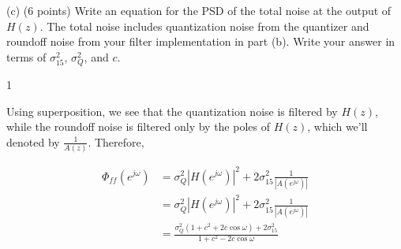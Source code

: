 \documentclass[10pt]{article}
\def\SOLUTIONS{0} %
\def\SolutionsColor{red2}
\begin{document}
\begin{description}
\item{(c)} (6 points) Write an equation for the PSD of the total noise at the output of $H(z)$. The total noise includes quantization noise from the quantizer and roundoff noise from your filter implementation in part (b). Write your answer in terms of $\sigma_{15}^2$, $\sigma_{Q}^2$, and $c$.

\if\SOLUTIONS1
{\color{\SolutionsColor}
Using superposition, we see that the quantization noise is filtered by $H(z)$, while the roundoff noise is filtered only by the poles of $H(z)$, which we'll denoted by $\frac{1}{A(z)}$. Therefore,

\begin{align*}
\Phi_{ff}(e^{j\omega}) &= \sigma_Q^2|H(e^{j\omega})|^2 + 2\sigma_{15}^2\frac{1}{|A(e^{j\omega})|} \\
&= \sigma_Q^2|H(e^{j\omega})|^2 + 2\sigma_{15}^2\frac{1}{|A(e^{j\omega})|} \\
& = \frac{\sigma_Q^2(1 + c^2 + 2c\cos\omega) + 2\sigma_{15}^2}{1 + c^2 - 2c\cos\omega}
\end{align*}

}
\else\vspace{5cm}
\fi
\end{description}
\end{document}

